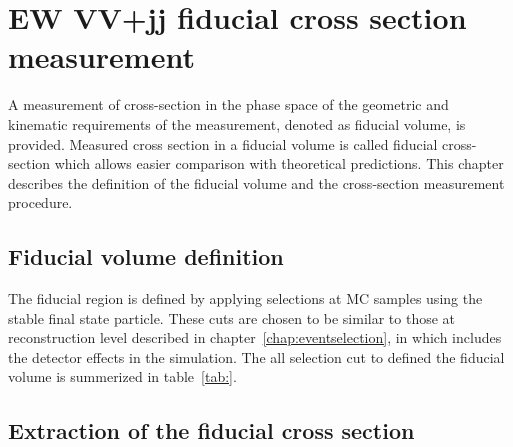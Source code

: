 \chapter{EW VV+jj fiducial cross section measurement}
\label{chap:crosssection}
A measurement of cross-section in the phase space of the geometric and kinematic requirements of the measurement, denoted as fiducial volume, is provided.
Measured cross section in a fiducial volume is called fiducial cross-section which allows easier comparison with theoretical predictions. 
This chapter describes the definition of the fiducial volume and the cross-section measurement procedure.

\section{Fiducial volume definition}
The fiducial region is defined by applying selections at MC samples using the stable final state particle. 
These cuts are chosen to be similar to those at reconstruction level described in chapter~\ref{chap:eventselection}, in which includes the detector effects in the simulation.
The all selection cut to defined the fiducial volume is summerized in table~\ref{tab:}.



\section{Extraction of the fiducial cross section}